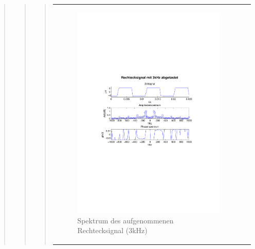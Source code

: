 \begin{quote}
\begin{quote}
\begin{quote}
\begin{center}
\begin{tabular}{ll}
\begin{minipage}{0.6\textwidth}
                        \begin{figure}[H]
                            \label{fig:}
                            \includegraphics[scale=0.65, trim = 3cm 9cm 3cm
                            8.5cm, clip]{./Bilder/6_2_rechteck_3kHz}
                            \caption{Spektrum des aufgenommenen Rechtecksignal
                            (3kHz)}
                        \end{figure}
    
                    \end{minipage}
                    \begin{minipage}{0.6\textwidth}
    

\end{minipage}
\end{tabular}
\end{center}
\end{quote}
\end{quote}
\end{quote}
